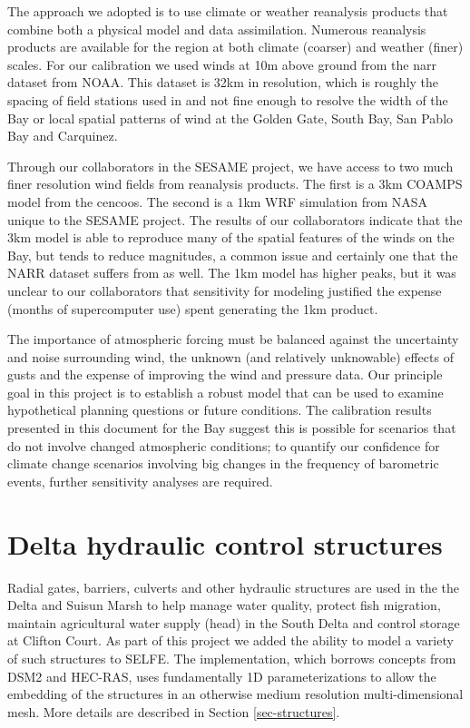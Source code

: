 The approach we adopted is to use climate or weather reanalysis products that 
combine both a physical model and data assimilation. 
Numerous reanalysis products are available for the region at both climate 
(coarser) and weather (finer) scales. For our calibration we used winds
at 10m above ground from the \gls{narr} 
dataset from NOAA. This dataset is 32km in resolution, which is roughly 
the spacing of field stations used in \citep{MacWilliams08,MacWilliams09} and not fine enough
to resolve the width of the Bay or local spatial patterns of wind at 
the Golden Gate, South Bay, San Pablo Bay and Carquinez.

Through our collaborators in the SESAME project, we have access
to two much finer resolution wind fields 
from reanalysis products. The first is a 3km COAMPS model from the \gls{cencoos}. 
The second is a 1km WRF simulation from NASA unique 
to the SESAME project. The results of our collaborators indicate that the 3km model is able 
to reproduce many of the spatial features of the winds on the Bay, but
tends to reduce magnitudes, a common issue and certainly one that the NARR dataset suffers
from as well. The 1km model has higher peaks, but it was unclear to our collaborators 
that sensitivity for modeling justified the expense (months of supercomputer use) spent generating the 1km
product. 

The importance of atmospheric forcing must be balanced against the uncertainty and noise surrounding wind, 
the unknown (and relatively unknowable) effects of gusts and the expense of improving the wind and pressure data. 
Our principle goal in this project is to establish a robust model that can be used to examine hypothetical 
planning questions or future conditions. The calibration results presented 
in this document for the Bay suggest this is possible for scenarios that 
do not involve changed atmospheric conditions; to quantify our confidence for climate change scenarios 
involving big changes in the frequency of barometric events, further sensitivity analyses are required.


\section{Delta hydraulic control structures}
\label{sec-delta-structs}
Radial gates, barriers, culverts and other hydraulic structures are used in the the 
Delta and Suisun Marsh to help manage water quality, protect fish migration, maintain 
agricultural water supply (head) in the South Delta and control storage at Clifton Court. As part of this project
we added the ability to model a variety of such structures to SELFE. The implementation, 
which borrows concepts from DSM2 and HEC-RAS, uses fundamentally
1D parameterizations to allow the embedding of the structures in 
an otherwise medium resolution multi-dimensional mesh. More details are described in 
Section \ref{sec-structures}. 


